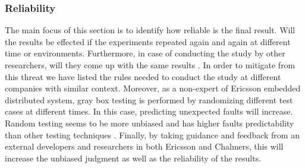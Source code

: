\subsubsection{Reliability}
The main focus of this section is to identify how reliable is the final result. Will the results be effected if the experiments repeated again and again at different time or environments. Furthermore, in case of conducting the study by other researchers, will they come up with the same results \cite{guidelines}. In order to mitigate from this threat we have listed the rules needed to conduct the study at different companies with similar context. Moreover, as a non-expert of Ericsson embedded distributed system, gray box testing is performed by randomizing different test cases at different times. In this case, predicting unexpected faults will increase. Random testing seems to be more unbiased and has higher faults predictability than other testing techniques \cite{random}. Finally, by taking guidance and feedback from an external developers and researchers in both Ericsson and Chalmers, this will increase the unbiased judgment as well as the reliability of the results.

